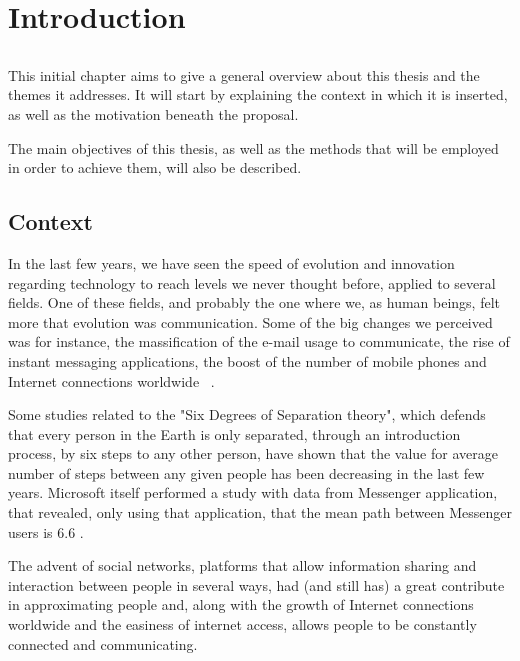 \chapter{Introduction} \label{chap:intro}

\section*{}

This initial chapter aims to give a general overview about this thesis and the themes it addresses. It will start by explaining the context in which it is inserted, as well as the motivation beneath the proposal.

The main objectives of this thesis, as well as the methods that will be employed in order to achieve them, will also be described.



\section{Context} \label{sec:context}

In the last few years, we have seen the speed of evolution and innovation regarding technology to reach levels we never thought before, applied to several fields. One of these fields, and probably the one where we, as human beings, felt more that evolution was communication. 
Some of the big changes we perceived was for instance, the massification of the e-mail usage to communicate, the rise of instant messaging applications, the boost of the number of mobile phones and Internet connections worldwide ~\cite{kn:Int13}.

Some studies \cite{kn:DMW03} related to the "Six Degrees of Separation theory", which defends that every person in the Earth is only separated, through an introduction process, by six steps to any other person, have shown that the value for average number of steps between any given people has been decreasing in the last few years. Microsoft itself performed a study with data from Messenger application, that revealed, only using that application, that the mean path between Messenger users is 6.6 \cite{kn:LH07}.

The advent of social networks, platforms that allow information sharing and interaction between people in several ways, had (and still has) a great contribute in approximating people and, along with the growth of Internet connections worldwide and the easiness of internet access, allows people to be constantly connected and communicating.

